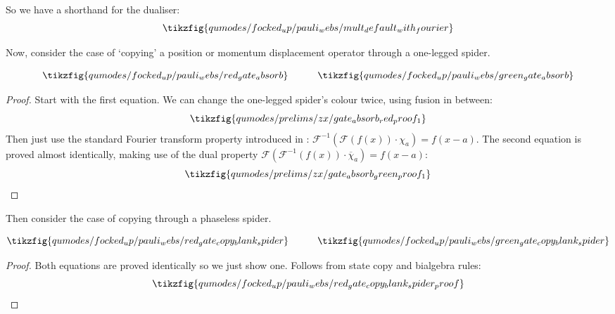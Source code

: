 So we have a shorthand for the dualiser:
\begin{equation}\label{eq:mult_default_is_dualiser}
\tikzfig{qumodes/focked_up/pauli_webs/mult_default_with_fourier}
\end{equation}

Now, consider the case of `copying' a position or momentum displacement operator through a one-legged spider.

\begin{lemma}\label{lem:gate_absorb}
\begin{equation}\label{eq:gate_absorb}
\tikzfig{qumodes/focked_up/pauli_webs/red_gate_absorb}
\qqquad
\tikzfig{qumodes/focked_up/pauli_webs/green_gate_absorb}
\end{equation}
\begin{proof}
    Start with the first equation.
    We can change the one-legged spider's colour twice, using fusion in between:
    \begin{equation*}\label{eq:gate_absorb_red_proof}
    \tikzfig{qumodes/prelims/zx/gate_absorb_red_proof_1}
    \end{equation*}
    Then just use the standard Fourier transform property introduced in : $\mathcal{F}^{-1}(\mathcal{F}(f(x)) \cdot \chi_a) = f(x - a)$.
    The second equation is proved almost identically, making use of the dual property $\mathcal{F}(\mathcal{F}^{-1}(f(x)) \cdot \overline{\chi}_a) = f(x - a)$:
    \begin{equation*}
    \tikzfig{qumodes/prelims/zx/gate_absorb_green_proof_1}
    \end{equation*}
\end{proof}
\end{lemma}

Then consider the case of copying through a phaseless spider.

\begin{lemma}\label{lem:gate_copy_blank_spider}
\begin{equation}\label{eq:gate_copy_blank_spider}
\tikzfig{qumodes/focked_up/pauli_webs/red_gate_copy_blank_spider}
\qqquad
\tikzfig{qumodes/focked_up/pauli_webs/green_gate_copy_blank_spider}
\end{equation}
\begin{proof}
    Both equations are proved identically so we just show one.
    Follows from state copy and bialgebra rules:
    \begin{equation}\label{eq:red_gate_copy_blank_spider_proof}
    \tikzfig{qumodes/focked_up/pauli_webs/red_gate_copy_blank_spider_proof}
    \end{equation}
\end{proof}
\end{lemma}


